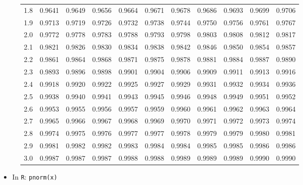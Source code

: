 \begin{figure}[!h]
\begin{center}
\begin{tabular}{|r|rrrrrrrrrr|}
1.8&0.9641&0.9649&0.9656&0.9664&0.9671&0.9678&0.9686&0.9693&0.9699&0.9706\\
1.9&0.9713&0.9719&0.9726&0.9732&0.9738&0.9744&0.9750&0.9756&0.9761&0.9767\\
2.0&0.9772&0.9778&0.9783&0.9788&0.9793&0.9798&0.9803&0.9808&0.9812&0.9817\\
2.1&0.9821&0.9826&0.9830&0.9834&0.9838&0.9842&0.9846&0.9850&0.9854&0.9857\\
2.2&0.9861&0.9864&0.9868&0.9871&0.9875&0.9878&0.9881&0.9884&0.9887&0.9890\\
2.3&0.9893&0.9896&0.9898&0.9901&0.9904&0.9906&0.9909&0.9911&0.9913&0.9916\\
2.4&0.9918&0.9920&0.9922&0.9925&0.9927&0.9929&0.9931&0.9932&0.9934&0.9936\\
2.5&0.9938&0.9940&0.9941&0.9943&0.9945&0.9946&0.9948&0.9949&0.9951&0.9952\\
2.6&0.9953&0.9955&0.9956&0.9957&0.9959&0.9960&0.9961&0.9962&0.9963&0.9964\\
2.7&0.9965&0.9966&0.9967&0.9968&0.9969&0.9970&0.9971&0.9972&0.9973&0.9974\\
2.8&0.9974&0.9975&0.9976&0.9977&0.9977&0.9978&0.9979&0.9979&0.9980&0.9981\\
2.9&0.9981&0.9982&0.9982&0.9983&0.9984&0.9984&0.9985&0.9985&0.9986&0.9986\\
3.0&0.9987&0.9987&0.9987&0.9988&0.9988&0.9989&0.9989&0.9989&0.9990&0.9990\\
\hline
\end{tabular}
\end{center}
\end{figure}

\begin{itemize}
  \item In \texttt{R}: \texttt{pnorm(x)}
\end{itemize}

\pagebreak
